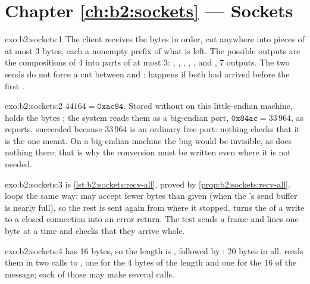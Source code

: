 \section*{Chapter \ref{ch:b2:sockets} --- Sockets}

\begin{solution}{exo:b2:sockets:1}
The client receives the bytes  in order, cut anywhere into pieces of at most 3 bytes, each a nonempty
prefix of what is left. The possible outputs are the compositions of 4 into parts of at most 3: \code{[abc][d]},
\code{[a][bcd]}, \code{[ab][cd]}, \code{[ab][c][d]}, \code{[a][bc][d]}, \code{[a][b][cd]} and \code{[a][b][c][d]},
7 outputs. The two sends do not force a cut between  and : \code{[abc][d]} happens if both had
arrived before the first .
\end{solution}

\begin{solution}{exo:b2:sockets:2}
$44164 = \mathtt{0xac84}$. Stored without  on this little-endian machine,  holds the bytes
; the system reads them as a big-endian port, $\mathtt{0x84ac} = 33\,964$, as 
reports.  succeeded because 33\,964 is an ordinary free port: nothing checks that it is the one meant. On a
big-endian machine the bug would be invisible, as  does nothing there; that is why the conversion must be
written even where it is not needed.
\end{solution}

\begin{solution}{exo:b2:sockets:3}
 is \cref{lst:b2:sockets:recv-all}, proved by \cref{prop:b2:sockets:recv-all}. 
loops the same way:  may accept fewer bytes than given (when the 's send buffer is nearly full), so
the rest is sent again from where it stopped.  turns the  of a write to a closed
connection into an error return. The test sends a frame and lines one byte at a time and checks that they arrive
whole.
\end{solution}

\begin{solution}{exo:b2:sockets:4}
 has 16 bytes, so the length is , followed by : 20 bytes in all.  reads them in two calls to , one for the 4
bytes of the length and one for the 16 of the message; each of those may make several  calls.
\end{solution}

